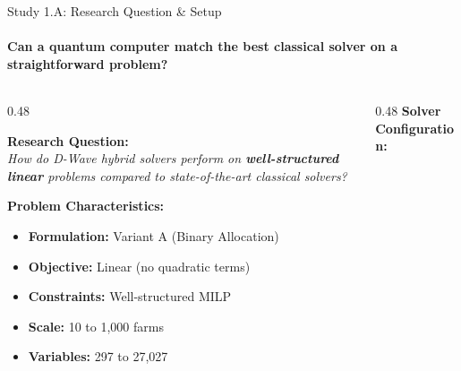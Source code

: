 \documentclass[aspectratio=169,10pt]{beamer}
\begin{document}
\begin{frame}{Study 1.A: Research Question \& Setup}
    \framesubtitle{Can a quantum computer match the best classical solver on a straightforward problem?}
    
    \begin{columns}[T]
        \begin{column}{0.48\textwidth}
            \begin{keybox}
                \centering\small
                \textbf{Research Question:}\\[4pt]
                \textit{How do D-Wave hybrid solvers perform on \textbf{well-structured linear} problems compared to state-of-the-art classical solvers?}
            \end{keybox}
            
            \vspace{0.3cm}
            \small\textbf{Problem Characteristics:}
            \begin{itemize}\scriptsize
                \item \textbf{Formulation:} Variant A (Binary Allocation)
                \item \textbf{Objective:} Linear (no quadratic terms)
                \item \textbf{Constraints:} Well-structured MILP
                \item \textbf{Scale:} 10 to 1,000 farms
                \item \textbf{Variables:} 297 to 27,027
            \end{itemize}
        \end{column}
        
        \begin{column}{0.48\textwidth}
            \small\textbf{Solver Configuration:}
            
            \vspace{0.2cm}
            

\end{column}
\end{columns}
\end{frame}
\end{document}
